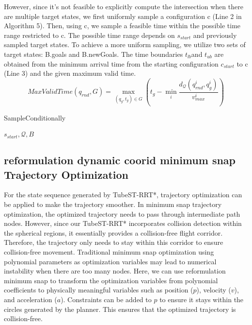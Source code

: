 \documentclass[times,authoryear]{elsarticle}
\newcommand{\Input}{\item[\textbf{Input:}]}
\begin{document}
However, since it's not feasible to explicitly compute the intersection when there are multiple target states, we first uniformly sample a configuration c (Line 2 in Algorithm 5). Then, using c, we sample a feasible time within the possible time range restricted to c. The possible time range depends on $s_{start}$ and previously sampled target states. To achieve a more uniform sampling, we utilize two sets of target states: B.goals and B.newGoals. The time boundaries $t_{lb}$and $t_{ub}$ are obtained from the minimum arrival time from the starting configuration $c_{start}$ to c (Line 3) and the given maximum valid time.
\begin{equation}
	MaxValidTime(q_{rnd},G) = \max_{(q_g,t_g)\in G}\left( t_{g} - \min_i \frac{d_{\mathcal{Q}}(q_{rnd}^i,q_{g}^i)}{v^i_{max}} \right)
\end{equation}

\begin{algorithm}[H]
	\caption[short]{SampleConditionally}
	\begin{algorithmic}[1]
		\Input{$s_{start},\mathcal{Q},B$}
		\WHILE{}
		\ELSE{}
		\ENDIF{}
		\ENDWHILE{}
	\end{algorithmic}
\end{algorithm}

\subsection{reformulation dynamic coorid minimum snap Trajectory Optimization}
For the state sequence generated by TubeST-RRT*, trajectory optimization can be applied to make the trajectory smoother. In minimum snap trajectory optimization, the optimized trajectory needs to pass through intermediate path nodes. However, since our TubeST-RRT* incorporates collision detection within the spherical regions, it essentially provides a collision-free flight corridor. Therefore, the trajectory only needs to stay within this corridor to ensure collision-free movement. Traditional minimum snap optimization using polynomial parameters as optimization variables may lead to numerical instability when there are too many nodes. Here, we can use reformulation minimum snap to transform the optimization variables from polynomial coefficients to physically meaningful variables such as position ($p$), velocity ($v$), and acceleration ($a$). Constraints can be added to $p$ to ensure it stays within the circles generated by the planner. This ensures that the optimized trajectory is collision-free.
\end{document}
